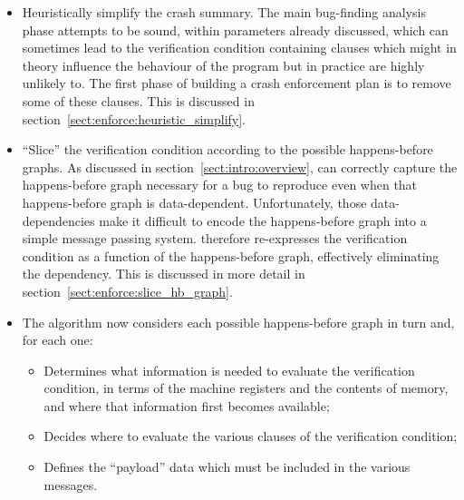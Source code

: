 \begin{itemize}
\item
  Heuristically simplify the crash summary.  The main bug-finding
  analysis phase attempts to be sound, within parameters already
  discussed, which can sometimes lead to the verification condition
  containing clauses which might in theory influence the behaviour of
  the program but in practice are highly unlikely to.  The first phase
  of building a crash enforcement plan is to remove some of these
  clauses.  This is discussed in
  section~\ref{sect:enforce:heuristic_simplify}.
\item
  ``Slice'' the verification condition according to the possible
  happens-before graphs. As discussed in
  section~\ref{sect:intro:overview}, {\technique} can correctly
  capture the happens-before graph necessary for a bug to reproduce
  even when that happens-before graph is data-dependent.
  Unfortunately, those data-dependencies make it difficult to encode
  the happens-before graph into a simple message passing system.
  {\Technique} therefore re-expresses the verification condition as a
  function of the happens-before graph, effectively eliminating the
  dependency.  This is discussed in more detail in
  section~\ref{sect:enforce:slice_hb_graph}.
\item
  The algorithm now considers each possible happens-before graph in
  turn and, for each one:

  \begin{itemize}
  \item
    Determines what information is needed to evaluate the verification
    condition, in terms of the machine registers and the contents of
    memory, and where that information first becomes available;
  \item
    Decides where to evaluate the various clauses of the verification
    condition;
  \item
    Defines the ``payload'' data which must be included in the various
    messages.
  \end{itemize}


\end{itemize}
